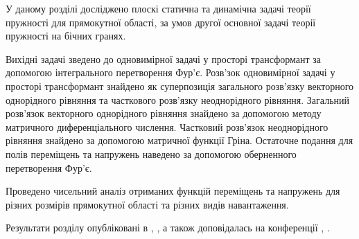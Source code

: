У даному розділі досліджено плоскі статична та динамічна задачі теорії пружності для прямокутної області,
за умов другої основної задачі теорії пружності на бічних гранях.

Вихідні задачі зведено до одновимірної задачі у просторі трансформант за допомогою інтегрального перетворення Фур'є.
Розв'зок одновимірної задачі у просторі трансформант знайдено як суперпозиція загального розв'язку векторного однорідного рівняння
та часткового розв'язку неоднорідного рівняння.
Загальний розв'язок векторного однорідного рівняння знайдено за допомогою методу матричного диференціального числення.
Частковий розв'язок неоднорідного рівняння знайдено за допомогою матричної функції Гріна.
Остаточне подання для полів переміщень та напружень наведено за допомогою оберненного перетворення Фур'є.

Проведено чисельний аналіз отриманих функцій переміщень та напружень для різних розмірів прямокутної області та різних видів навантаження.

Результати розділу опубліковані в \cite{pozhylenkov_4}, \cite{pozhylenkov_6}, а також доповідалась на конференції \cite{conf_3}, \cite{conf_5}.